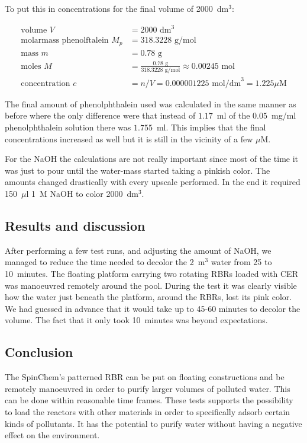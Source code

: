 To put this in concentrations for the final volume of 2000~dm$^3$:

\begin{align}
    \text{volume } V &= 2000 \text{ dm}^3 \\
    \text{molarmass phenolftalein } M_p &= 318.3228 \text{ g/mol} \\
    \text{mass } m &= 0.78 \text{ g} \\
    \text{moles } M &= \frac{0.78 \text{ g}}{318.3228 \text{ g/mol}} \approx 0.00245 \text{ mol} \\
    \text{concentration } c &= n/V = 0.000001225 \text{ mol/dm}^3 = 1.225 \mu\text{M}
\end{align}

The final amount of phenolphthalein used was calculated in the same manner as before where the only difference were that instead of $1.17$~ml of the $0.05$~mg/ml phenolphthalein solution there was $1.755$~ml.
This implies that the final concentrations increased as well but it is still in the vicinity of a few $\mu$M.

For the NaOH the calculations are not really important since most of the time it was just to pour until the water-mass started taking a pinkish color. The amounts changed drastically with every upscale performed. In the end it required 150~$\mu$l 1~M NaOH to color 2000~dm$^3$.

\subsection{Results and discussion}
After performing a few test runs, and adjusting the amount of NaOH, we managed to reduce the time needed to decolor the 2~m$^3$ water from 25 to 10~minutes. The floating platform carrying two rotating RBRs loaded with CER was manoeuvred remotely around the pool. During the test it was clearly visible how the water just beneath the platform, around the RBRs, lost its pink color.
We had guessed in advance that it would take up to 45-60 minutes to decolor the volume. The fact that it only took 10~minutes was beyond expectations.

\subsection{Conclusion}
The SpinChem\textsuperscript{\textregistered}'s patterned RBR can be put on floating constructions and be remotely manoeuvred in order to purify larger volumes of polluted water. This can be done within reasonable time frames. These tests supports the possibility to load the reactors with other materials in order to specifically adsorb certain kinds of pollutants. It has the potential to purify water without having a negative effect on the environment.
